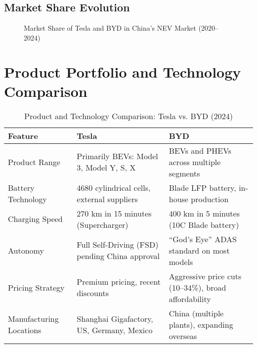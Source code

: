 \documentclass{article}
\begin{document}
\subsection{Market Share Evolution}

\begin{figure}[ht]
\centering
{}
\caption{Market Share of Tesla and BYD in China's NEV Market (2020--2024)}
\label{fig:market_share}
\end{figure}

\section{Product Portfolio and Technology Comparison}

\begin{table}[ht]
\centering
\caption{Product and Technology Comparison: Tesla vs. BYD (2024)}
\label{tab:product_tech}
\begin{tabularx}{\textwidth}{l X X}
\toprule
Feature & Tesla & BYD \\
\midrule
Product Range & Primarily BEVs: Model 3, Model Y, S, X & BEVs and PHEVs across multiple segments \\
Battery Technology & 4680 cylindrical cells, external suppliers & Blade LFP battery, in-house production \\
Charging Speed & 270 km in 15 minutes (Supercharger) & 400 km in 5 minutes (10C Blade battery) \\
Autonomy & Full Self-Driving (FSD) pending China approval & ``God's Eye'' ADAS standard on most models \\
Pricing Strategy & Premium pricing, recent discounts & Aggressive price cuts (10--34\%), broad affordability \\
Manufacturing Locations & Shanghai Gigafactory, US, Germany, Mexico & China (multiple plants), expanding overseas \\
\bottomrule
\end{tabularx}
\end{table}
\end{document}
